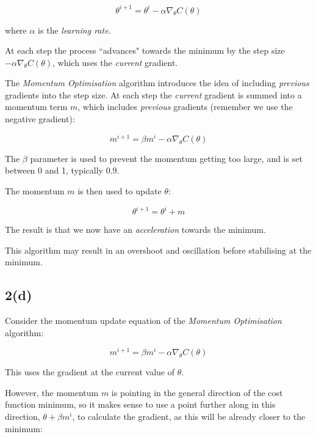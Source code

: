 \documentclass[12pt, a4paper,reqno]{article}
\begin{document}
\begin{equation}
\theta^{i+1} = \theta^i - \alpha\nabla_\theta C(\theta)
\end{equation}

where $\alpha$ is the \emph{learning rate}.

At each step the process ``advances" towards the minimum by the step size $- \alpha\nabla_\theta C(\theta)$, which uses the \emph{current} gradient.

The \emph{Momentum Optimisation} algorithm introduces the idea of including \emph{previous} gradients into the step size.  At each step the \emph{current} gradient is summed into a momentum term $m$, which includes \emph{previous} gradients (remember we use the negative gradient):

\begin{equation}
m^{i+1} = \beta m^i - \alpha\nabla_\theta C(\theta)
\end{equation}

The $\beta$ parameter is used to prevent the momentum getting too large, and is set between 0 and 1, typically 0.9.

The momentum $m$ is then used to update $\theta$:

\begin{equation}
\theta^{i+1} = \theta^i + m
\end{equation}

The result is that we now have an \emph{acceleration} towards the minimum.

This algorithm may result in an overshoot and oscillation before stabilising at the minimum.  

\subsection*{2(d)}

Consider the momentum update equation of the \emph{Momentum Optimisation} algorithm:

\begin{equation}
m^{i+1} = \beta m^i - \alpha\nabla_\theta C(\theta)
\end{equation}

This uses the gradient at the current value of $\theta$.

However, the momentum $m$ is pointing in the general direction of the cost function minimum, so it makes sense to use a point further along in this direction, $\theta + \beta m^i$, to calculate the gradient, as this will be already closer to the minimum:
\end{document}
